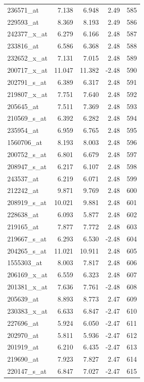 \begin{footnotesize}
\begin{longtable}{lrrrr}
236571\_at & 7.138 & 6.948 & 2.49 & 585 \\
229593\_at & 8.369 & 8.193 & 2.49 & 586 \\
242377\_x\_at & 6.279 & 6.166 & 2.48 & 587 \\
233816\_at & 6.586 & 6.368 & 2.48 & 588 \\
232652\_x\_at & 7.131 & 7.015 & 2.48 & 589 \\
200717\_x\_at & 11.047 & 11.382 & -2.48 & 590 \\
202791\_s\_at & 6.389 & 6.317 & 2.48 & 591 \\
219807\_x\_at & 7.751 & 7.640 & 2.48 & 592 \\
205645\_at & 7.511 & 7.369 & 2.48 & 593 \\
210569\_s\_at & 6.392 & 6.282 & 2.48 & 594 \\
235954\_at & 6.959 & 6.765 & 2.48 & 595 \\
1560706\_at & 8.193 & 8.003 & 2.48 & 596 \\
200752\_s\_at & 6.801 & 6.679 & 2.48 & 597 \\
208947\_s\_at & 6.217 & 6.107 & 2.48 & 598 \\
243537\_at & 6.219 & 6.071 & 2.48 & 599 \\
212242\_at & 9.871 & 9.769 & 2.48 & 600 \\
208919\_s\_at & 10.021 & 9.881 & 2.48 & 601 \\
228638\_at & 6.093 & 5.877 & 2.48 & 602 \\
219165\_at & 7.877 & 7.772 & 2.48 & 603 \\
219667\_s\_at & 6.293 & 6.530 & -2.48 & 604 \\
204265\_s\_at & 11.021 & 10.911 & 2.48 & 605 \\
1555303\_at & 8.003 & 7.817 & 2.48 & 606 \\
206169\_x\_at & 6.559 & 6.323 & 2.48 & 607 \\
201381\_x\_at & 7.636 & 7.761 & -2.48 & 608 \\
205639\_at & 8.893 & 8.773 & 2.47 & 609 \\
230383\_x\_at & 6.633 & 6.847 & -2.47 & 610 \\
227696\_at & 5.924 & 6.050 & -2.47 & 611 \\
202970\_at & 5.811 & 5.936 & -2.47 & 612 \\
201919\_at & 6.210 & 6.435 & -2.47 & 613 \\
219690\_at & 7.923 & 7.827 & 2.47 & 614 \\
220147\_s\_at & 6.847 & 7.027 & -2.47 & 615 \\

\end{longtable}
\end{footnotesize}
